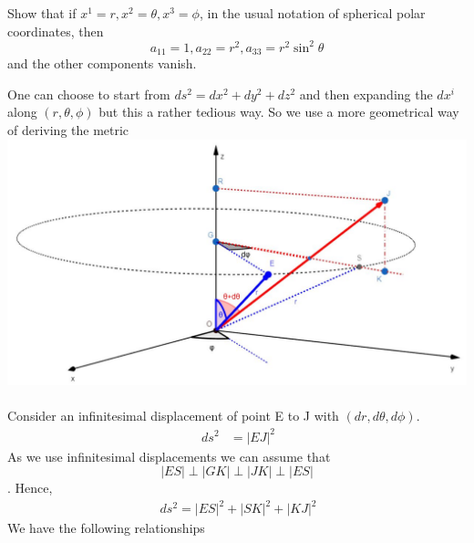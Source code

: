 \begin{tcolorbox}
Show that if $x^1 = r, x^2 = \theta, x^3 = \phi$, in the usual notation of spherical polar coordinates, then $$ a_{11} =1, a_{22} = r^2, a_{33} = r^2\sin^2\theta$$ and the other components vanish.
\end{tcolorbox}
One can choose to start from $ds^2 = dx^2+dy^2+dz^2$ and then expanding the $dx^i$ along $(r,\theta,\phi)$ but this a rather tedious way. So we use a more geometrical way of deriving the metric\\
\includegraphics[scale=.6]{sphericalmetric.jpg}\\\\
Consider an infinitesimal displacement of point E to J with $(dr,d\theta, d\phi )$.
\begin{align}
\ ds^2 &= |EJ|^2
\end{align}
As we use infinitesimal displacements we can assume that $$|ES|\perp|GK|\perp|JK|\perp|ES|$$. Hence,
\begin{align}
\ ds^2 = |ES|^2+|SK|^2+|KJ|^2
\end{align}
We have the following relationships
